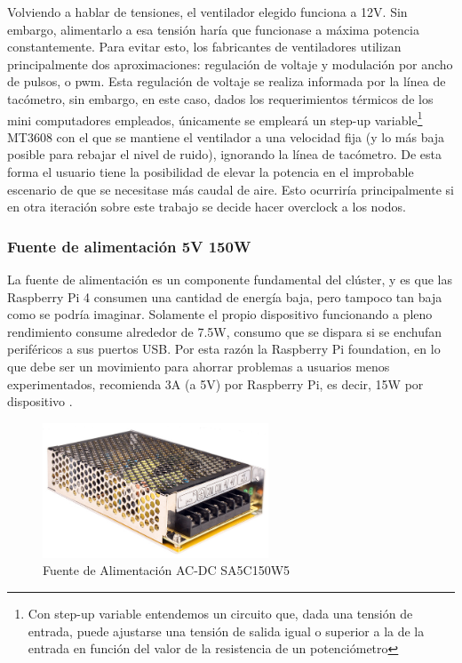Volviendo a hablar de tensiones, el ventilador elegido funciona a 12V. Sin embargo, alimentarlo a esa tensión haría que funcionase a máxima potencia constantemente. Para evitar esto, los fabricantes de ventiladores utilizan principalmente dos aproximaciones: regulación de voltaje y modulación por ancho de pulsos, o \acrshort{pwm}. Esta regulación de voltaje se realiza informada por la línea de tacómetro, sin embargo, en este caso, dados los requerimientos térmicos de los mini computadores empleados, únicamente se empleará un step-up variable\footnote{Con step-up variable entendemos un circuito que, dada una tensión de entrada, puede ajustarse una tensión de salida igual o superior a la de la entrada en función del valor de la resistencia de un potenciómetro} MT3608 con el que se mantiene el ventilador a una velocidad fija (y lo más baja posible para rebajar el nivel de ruido), ignorando la línea de tacómetro.
De esta forma el usuario tiene la posibilidad de elevar la potencia en el improbable escenario de que se necesitase más caudal de aire. Esto ocurriría principalmente si en otra iteración sobre este trabajo se decide hacer \gls{overclock} a los nodos.

\subsubsection{Fuente de alimentación 5V 150W}
La fuente de alimentación es un componente fundamental del clúster, y es que las Raspberry Pi 4 consumen una cantidad de energía baja, pero tampoco tan baja como se podría imaginar. Solamente el propio dispositivo funcionando a pleno rendimiento consume alrededor de 7.5W, consumo que se dispara si se enchufan periféricos a sus puertos USB. Por esta razón la Raspberry Pi foundation, en lo que debe ser un movimiento para ahorrar problemas a usuarios menos experimentados, recomienda 3A (a 5V) por Raspberry Pi, es decir, 15W por dispositivo \cite{raspberrypi_power-requirements}.

\begin{figure}[h!]
  \vspace*{0.5cm}
  \centering
  \includegraphics[width=0.60\textwidth]{img/psu.jpg}
  \caption{Fuente de Alimentación AC-DC SA5C150W5}
  \label{fig:psu_photo}
  \vspace*{0.1cm}
\end{figure}

